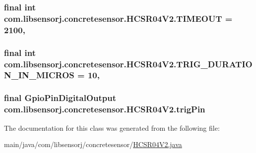 \subsubsection[{T\+I\+M\+E\+O\+U\+T}]{\setlength{\rightskip}{0pt plus 5cm}final int com.\+libsensorj.\+concretesensor.\+H\+C\+S\+R04\+V2.\+T\+I\+M\+E\+O\+U\+T = 2100\hspace{0.3cm}{\ttfamily [static]}, {\ttfamily [private]}}\label{classcom_1_1libsensorj_1_1concretesensor_1_1HCSR04V2_ae1819821d8d91299ef5cd940d8e95454}
\hypertarget{classcom_1_1libsensorj_1_1concretesensor_1_1HCSR04V2_a069ec2c4a1f2f1646fa38eb438bec15c}{}
\subsubsection[{T\+R\+I\+G\+\_\+\+D\+U\+R\+A\+T\+I\+O\+N\+\_\+\+I\+N\+\_\+\+M\+I\+C\+R\+O\+S}]{\setlength{\rightskip}{0pt plus 5cm}final int com.\+libsensorj.\+concretesensor.\+H\+C\+S\+R04\+V2.\+T\+R\+I\+G\+\_\+\+D\+U\+R\+A\+T\+I\+O\+N\+\_\+\+I\+N\+\_\+\+M\+I\+C\+R\+O\+S = 10\hspace{0.3cm}{\ttfamily [static]}, {\ttfamily [private]}}\label{classcom_1_1libsensorj_1_1concretesensor_1_1HCSR04V2_a069ec2c4a1f2f1646fa38eb438bec15c}
\hypertarget{classcom_1_1libsensorj_1_1concretesensor_1_1HCSR04V2_af997fea7e3e027fdb73884169208104d}{}
\subsubsection[{trig\+Pin}]{\setlength{\rightskip}{0pt plus 5cm}final Gpio\+Pin\+Digital\+Output com.\+libsensorj.\+concretesensor.\+H\+C\+S\+R04\+V2.\+trig\+Pin\hspace{0.3cm}{\ttfamily [private]}}\label{classcom_1_1libsensorj_1_1concretesensor_1_1HCSR04V2_af997fea7e3e027fdb73884169208104d}


The documentation for this class was generated from the following file\+:\begin{DoxyCompactItemize}
\item 
main/java/com/libsensorj/concretesensor/\hyperlink{HCSR04V2_8java}{H\+C\+S\+R04\+V2.\+java}\end{DoxyCompactItemize}
